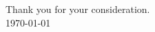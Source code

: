 \documentclass[12pt]{article}
\begin{document}
\noindent Thank you for your consideration. \\

\noindent \today
	











	
	
	
	
	
\end{document}
